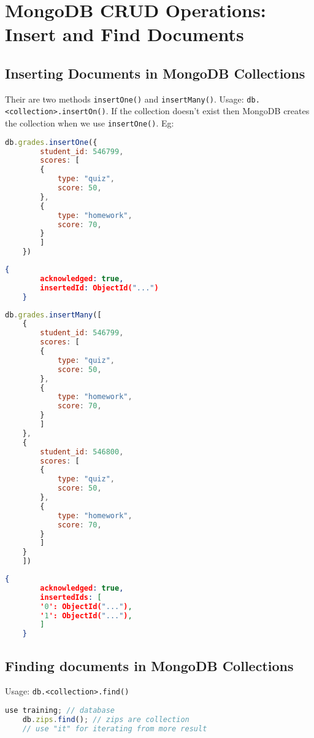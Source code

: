 \documentclass[../main.tex]{subfiles}
\begin{document}
\chapter{MongoDB CRUD Operations: Insert and Find Documents}
\section{Inserting Documents in MongoDB Collections}
Their are two methods 
\lstinline {insertOne()} and \lstinline {insertMany()}.
\newline
Usage: \lstinline {db.<collection>.insertOn()}.
If the collection doesn't exist then MongoDB creates the collection when we use \lstinline{insertOne()}.
Eg: 
\begin{lstlisting}[caption=insertOne using mongosh, language=JavaScript]
	db.grades.insertOne({
		student_id: 546799, 
		scores: [
		{
			type: "quiz", 
			score: 50,
		},
		{
			type: "homework", 
			score: 70,
		}
		]
	})
\end{lstlisting}

\begin{lstlisting}[caption=output of insertOne using mongosh, language=JSON]
	{
		acknowledged: true,
		insertedId: ObjectId("...")
	}
\end{lstlisting}

\begin{lstlisting}[caption=insertMany using mongosh, language=JavaScript]
	db.grades.insertMany([
	{
		student_id: 546799, 
		scores: [
		{
			type: "quiz", 
			score: 50,
		},
		{
			type: "homework", 
			score: 70,
		}
		]
	},
	{
		student_id: 546800, 
		scores: [
		{
			type: "quiz", 
			score: 50,
		},
		{
			type: "homework", 
			score: 70,
		}
		]
	}
	])
\end{lstlisting}
\begin{lstlisting}[caption=output of insertMany using mongosh, language=JSON]
	{
		acknowledged: true,
		insertedIds: [
		'0': ObjectId("..."),
		'1': ObjectId("..."),
		]
	}
\end{lstlisting}

\section{Finding documents in MongoDB Collections}
Usage: \lstinline{db.<collection>.find()}
\begin{lstlisting}[caption=find method in mongosh, language=JavaScript]
	use training; // database 
	db.zips.find(); // zips are collection 
	// use "it" for iterating from more result
\end{lstlisting}
\end{document}
